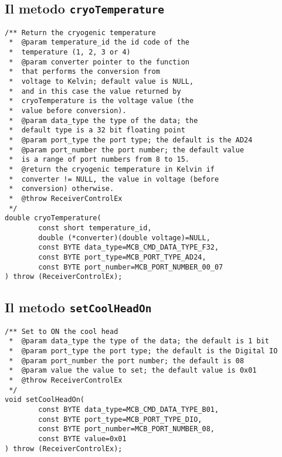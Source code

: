 \subsection{Il metodo \texttt{cryoTemperature}}
\lstset{language=C++}
\begin{lstlisting}[caption={Dichiarazione del metodo \texttt{cryoTemperature}},
label=lst:cryoTemperature,mathescape]
/** Return the cryogenic temperature
 *  @param temperature_id the id code of the 
 *  temperature (1, 2, 3 or 4)
 *  @param converter pointer to the function 
 *  that performs the conversion from
 *  voltage to Kelvin; default value is NULL,
 *  and in this case the value returned by 
 *  cryoTemperature is the voltage value (the 
 *  value before conversion).
 *  @param data_type the type of the data; the 
 *  default type is a 32 bit floating point
 *  @param port_type the port type; the default is the AD24
 *  @param port_number the port number; the default value 
 *  is a range of port numbers from 8 to 15.
 *  @return the cryogenic temperature in Kelvin if 
 *  converter != NULL, the value in voltage (before 
 *  conversion) otherwise.
 *  @throw ReceiverControlEx
 */
double cryoTemperature(
        const short temperature_id,
        double (*converter)(double voltage)=NULL,
        const BYTE data_type=MCB_CMD_DATA_TYPE_F32,
        const BYTE port_type=MCB_PORT_TYPE_AD24,  
        const BYTE port_number=MCB_PORT_NUMBER_00_07
) throw (ReceiverControlEx);
\end{lstlisting}
\lstset{numbers=none}


\subsection{Il metodo \texttt{setCoolHeadOn}}
\lstset{language=C++}
\begin{lstlisting}[caption={Dichiarazione del metodo \texttt{setCoolHeadOn}},
label=lst:setCoolHeadOn,mathescape]
/** Set to ON the cool head 
 *  @param data_type the type of the data; the default is 1 bit
 *  @param port_type the port type; the default is the Digital IO
 *  @param port_number the port number; the default is 08
 *  @param value the value to set; the default value is 0x01
 *  @throw ReceiverControlEx
 */
void setCoolHeadOn(
        const BYTE data_type=MCB_CMD_DATA_TYPE_B01,
        const BYTE port_type=MCB_PORT_TYPE_DIO,   
        const BYTE port_number=MCB_PORT_NUMBER_08,
        const BYTE value=0x01
) throw (ReceiverControlEx);
\end{lstlisting}
\lstset{numbers=none}


